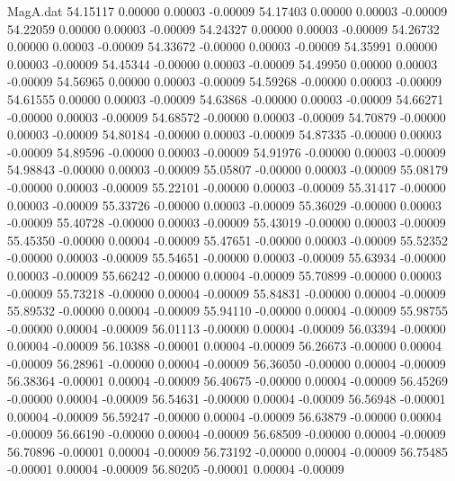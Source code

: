 \begin{filecontents}{MagA.dat}
  54.15117    0.00000    0.00003   -0.00009
  54.17403    0.00000    0.00003   -0.00009
  54.22059    0.00000    0.00003   -0.00009
  54.24327    0.00000    0.00003   -0.00009
  54.26732    0.00000    0.00003   -0.00009
  54.33672   -0.00000    0.00003   -0.00009
  54.35991    0.00000    0.00003   -0.00009
  54.45344   -0.00000    0.00003   -0.00009
  54.49950    0.00000    0.00003   -0.00009
  54.56965    0.00000    0.00003   -0.00009
  54.59268   -0.00000    0.00003   -0.00009
  54.61555    0.00000    0.00003   -0.00009
  54.63868   -0.00000    0.00003   -0.00009
  54.66271   -0.00000    0.00003   -0.00009
  54.68572   -0.00000    0.00003   -0.00009
  54.70879   -0.00000    0.00003   -0.00009
  54.80184   -0.00000    0.00003   -0.00009
  54.87335   -0.00000    0.00003   -0.00009
  54.89596   -0.00000    0.00003   -0.00009
  54.91976   -0.00000    0.00003   -0.00009
  54.98843   -0.00000    0.00003   -0.00009
  55.05807   -0.00000    0.00003   -0.00009
  55.08179   -0.00000    0.00003   -0.00009
  55.22101   -0.00000    0.00003   -0.00009
  55.31417   -0.00000    0.00003   -0.00009
  55.33726   -0.00000    0.00003   -0.00009
  55.36029   -0.00000    0.00003   -0.00009
  55.40728   -0.00000    0.00003   -0.00009
  55.43019   -0.00000    0.00003   -0.00009
  55.45350   -0.00000    0.00004   -0.00009
  55.47651   -0.00000    0.00003   -0.00009
  55.52352   -0.00000    0.00003   -0.00009
  55.54651   -0.00000    0.00003   -0.00009
  55.63934   -0.00000    0.00003   -0.00009
  55.66242   -0.00000    0.00004   -0.00009
  55.70899   -0.00000    0.00003   -0.00009
  55.73218   -0.00000    0.00004   -0.00009
  55.84831   -0.00000    0.00004   -0.00009
  55.89532   -0.00000    0.00004   -0.00009
  55.94110   -0.00000    0.00004   -0.00009
  55.98755   -0.00000    0.00004   -0.00009
  56.01113   -0.00000    0.00004   -0.00009
  56.03394   -0.00000    0.00004   -0.00009
  56.10388   -0.00001    0.00004   -0.00009
  56.26673   -0.00000    0.00004   -0.00009
  56.28961   -0.00000    0.00004   -0.00009
  56.36050   -0.00000    0.00004   -0.00009
  56.38364   -0.00001    0.00004   -0.00009
  56.40675   -0.00000    0.00004   -0.00009
  56.45269   -0.00000    0.00004   -0.00009
  56.54631   -0.00000    0.00004   -0.00009
  56.56948   -0.00001    0.00004   -0.00009
  56.59247   -0.00000    0.00004   -0.00009
  56.63879   -0.00000    0.00004   -0.00009
  56.66190   -0.00000    0.00004   -0.00009
  56.68509   -0.00000    0.00004   -0.00009
  56.70896   -0.00001    0.00004   -0.00009
  56.73192   -0.00000    0.00004   -0.00009
  56.75485   -0.00001    0.00004   -0.00009
  56.80205   -0.00001    0.00004   -0.00009

\end{filecontents}
